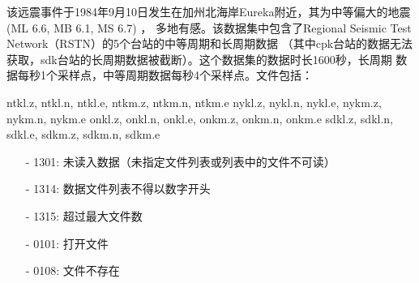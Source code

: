 该远震事件于1984年9月10日发生在加州北海岸Eureka附近，其为中等偏大的地震(ML 6.6, MB 6.1, MS 6.7) ，
多地有感。该数据集中包含了Regional Seismic Test Network（RSTN）的5个台站的中等周期和长周期数据
（其中cpk台站的数据无法获取，sdk台站的长周期数据被截断）。这个数据集的数据时长1600秒，长周期
数据每秒1个采样点，中等周期数据每秒4个采样点。文件包括：
\begin{SACCode} 
    ntkl.z, ntkl.n, ntkl.e, ntkm.z, ntkm.n, ntkm.e
    nykl.z, nykl.n, nykl.e, nykm.z, nykm.n, nykm.e
    onkl.z, onkl.n, onkl.e, onkm.z, onkm.n, onkm.e
    sdkl.z, sdkl.n, sdkl.e, sdkm.z, sdkm.n, sdkm.e
\end{SACCode}

\begin{itemize}
\item[-]1301: 未读入数据（未指定文件列表或列表中的文件不可读）
\item[-]1314: 数据文件列表不得以数字开头
\item[-]1315: 超过最大文件数
\end{itemize}

\begin{itemize}
\item[-]0101: 打开文件
\item[-]0108: 文件不存在
\end{itemize}
